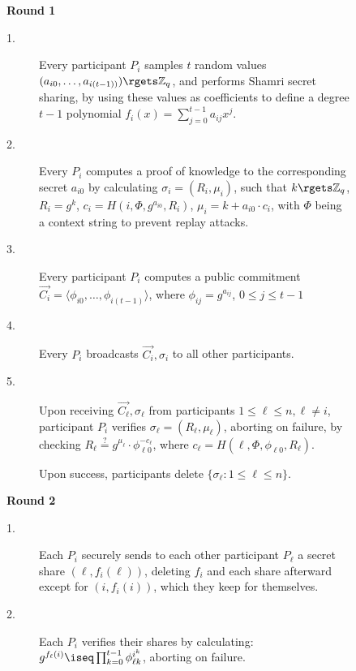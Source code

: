 
\begin{figure}[!ht]
  \begin{framed}

    \begin{flushleft}
    \textbf{Round 1}
\begin{description}
  \item[1.] Every participant $P_i$ samples $t$ random values
        $(a_{i0}, \dots, a_{i(t-1))}) \rgets \mathbb{Z}_q$,
        and performs Shamri secret sharing,
        by using these values as coefficients to define a degree $t-1$ polynomial $f_i(x) =
        \sum_{j=0}^{t-1} a_{ij} x^j$.
      \item[2.] Every $P_i$ computes a proof of knowledge to the
        corresponding secret $a_{i0}$ by calculating
        $\sigma_i = (R_i, \mu_i)$,
        such that
        $k \rgets \mathbb{Z}_q$, $R_i = g^k$,
        $c_i = H(i, \Phi, g^{a_{i0}}, R_i)$,
        $\mu_i = k + a_{i0}\cdot c_i$,
        with $\Phi$ being a context string to prevent
        replay attacks.
      \item[3.] Every participant $P_i$ computes a public commitment
        $\Vec{C_i} = \langle \phi_{i0}, \dots, \phi_{i(t-1)} \rangle$, where $\phi_{ij}
          = g^{a_{ij}}$, $0 \leq j \leq t-1$
      \item[4.] Every $P_i$ broadcasts $\Vec{C_i}, \sigma_i$ to all other
        participants.
      \item[5.] Upon receiving $\Vec{C_\ell}, \sigma_\ell$ from
        participants $1 \leq \ell \leq n, \ell \neq i$, participant $P_i$ verifies
        $\sigma_\ell = (R_\ell, \mu_\ell)$, aborting on failure, by
        checking
          \(R_\ell \stackrel{?}{=} g^{\mu_\ell} \cdot
           \phi_{\ell0}^{-c_\ell}\), where
          \(c_\ell = H\left(\ell, \Phi, \phi_{\ell 0}, R_\ell \right)\).

        Upon success, participants delete $\{ \sigma_\ell : 1 \le \ell \le n \} $.
\end{description}

    \smallskip

    \textbf{Round 2}
    \begin{description}
      \item[1.] Each $P_i$ securely sends to each other
      participant $P_\ell$
        a secret share $(\ell, f_i(\ell))$, deleting $f_i$ and each share
        afterward except for $(i, f_i(i))$, which they keep for themselves.
      \item[2.] Each $P_i$ verifies their shares by calculating:
          $g^{f_\ell(i)} \iseq \prod_{k=0}^{t-1} \phi_{\ell k}^{i^k}$, aborting on failure.


\end{description}
\end{flushleft}
\end{framed}
\end{figure}
